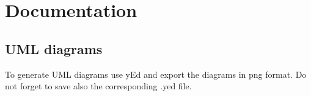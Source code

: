 \documentclass[a4]{article}
\begin{document}

\section{Documentation}

\subsection{UML diagrams}
To generate UML diagrams use yEd and export the diagrams in png format. Do not 
forget to save also the corresponding .yed file.
\end{document}
